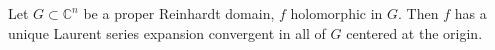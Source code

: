 Let $G \subset \mathbb{C}^n$ be a proper Reinhardt domain, $f$ holomorphic in $G$. Then $f$ has a unique Laurent series expansion convergent in all of $G$ centered at the origin.
